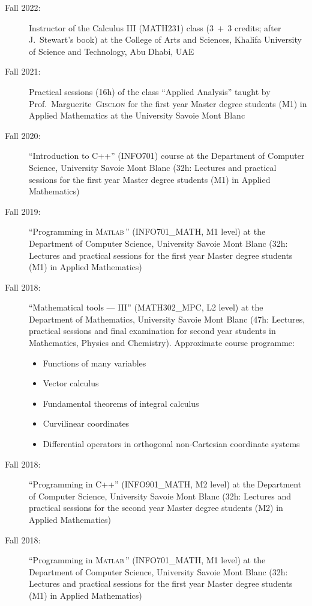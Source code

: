 \documentclass[final, a4paper, oneside, 12pt]{article}
\numberwithin{equation}{section}
\begin{document}
\begin{description}
  \item[Fall 2022:] Instructor of the Calculus III (MATH231) class ($3\ +\ 3$ credits; after J.~Stewart's book) at the College of Arts and Sciences, Khalifa University of Science and Technology, Abu Dhabi, UAE

  \item[Fall 2021:] Practical sessions (16h) of the class ``Applied Analysis'' taught by Prof.~Marguerite~\textsc{Gisclon} for the first year Master degree students (M1) in Applied Mathematics at the University Savoie Mont Blanc

  \item[Fall 2020:] ``Introduction to C++'' (INFO701) course at the Department of Computer Science, University Savoie Mont Blanc (32h: Lectures and practical sessions for the first year Master degree students (M1) in Applied Mathematics)

  \item[Fall 2019:] ``Programming in \textsc{Matlab}\texttrademark\,'' (INFO701\_MATH, M1 level) at the Department of Computer Science, University Savoie Mont Blanc (32h: Lectures and practical sessions for the first year Master degree students (M1) in Applied Mathematics)

  \item[Fall 2018:] ``Mathematical tools --- III'' (MATH302\_MPC, L2 level) at the Department of Mathematics, University Savoie Mont Blanc (47h: Lectures, practical sessions and final examination for second year students in Mathematics, Physics and Chemistry). Approximate course programme:
  \begin{itemize}
    \item Functions of many variables
    \item Vector calculus
    \item Fundamental theorems of integral calculus
    \item Curvilinear coordinates
    \item Differential operators in orthogonal non-Cartesian coordinate systems
  \end{itemize}

  \item[Fall 2018:] ``Programming in C++'' (INFO901\_MATH, M2 level) at the Department of Computer Science, University Savoie Mont Blanc (32h: Lectures and practical sessions for the second year Master degree students (M2) in Applied Mathematics)

  \item[Fall 2018:] ``Programming in \textsc{Matlab}\texttrademark\,'' (INFO701\_MATH, M1 level) at the Department of Computer Science, University Savoie Mont Blanc (32h: Lectures and practical sessions for the first year Master degree students (M1) in Applied Mathematics)


\end{description}
\end{document}
